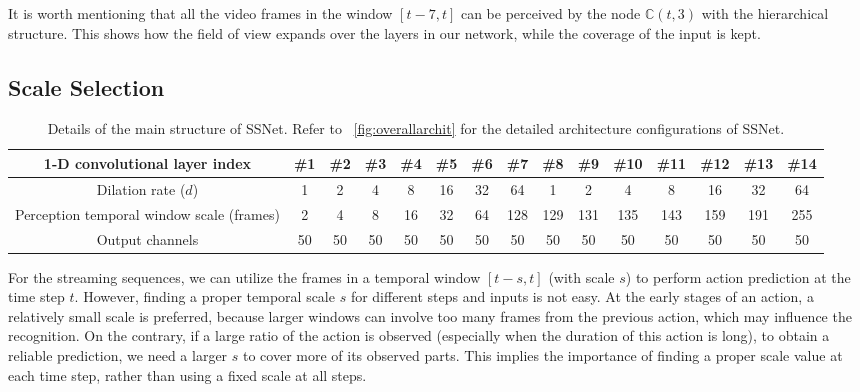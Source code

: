 \documentclass[10pt,twocolumn,letterpaper]{article}
\begin{document}
It is worth mentioning that all the video frames in the window $[t-7,t]$ can be perceived by the node $\mathbb{C}(t,3)$ with the hierarchical structure. This shows how the field of view expands over the layers in our network, while the coverage of the input is kept.







\subsection{Scale Selection}
\label{sec:method:SSS}




\begin{table*}[!tp]
\caption{Details of the main structure of SSNet. Refer to \figurename{~\ref{fig:overallarchit}} for the detailed architecture configurations of SSNet.}
\label{table:ssnetdetails}
\centering
\small
\begin{tabular}{ccccccccccccccc}
\toprule
1-D convolutional layer index                  & \#1 & \#2 & \#3  & \#4& \#5& \#6& \#7 & \#8 & \#9 &\#10 & \#11& \#12& \#13& \#14 \\
\midrule
Dilation rate ($d$)                          &   1 &   2 &   4  & 8  & 16 & 32 & 64  & 1   & 2   &   4 & 8   & 16  & 32  & 64 \\
Perception temporal window scale (frames)      &   2 &   4 &   8  & 16 & 32 & 64 & 128 & 129 & 131 & 135 & 143 & 159 & 191 & 255 \\
Output channels                                &  50 &  50 &  50  & 50 & 50 & 50 &  50 &  50 &  50 &  50 &  50 &  50 &  50 &  50 \\
\bottomrule
\end{tabular}
\end{table*}

For the streaming sequences,
we can utilize the frames in a temporal window $[t-s, t]$ (with scale $s$) to perform action prediction at the time step $t$.
However, finding a proper temporal scale $s$ for different steps and inputs is not easy.
At the early stages of an action,
a relatively small scale is preferred,
because larger windows can involve too many frames from the previous action, which may influence the recognition.
On the contrary, if a large ratio of the action is observed
(especially when the duration of this action is long),
to obtain a reliable prediction,
we need a larger $s$ to cover more of its observed parts.
This implies the importance of finding a proper scale value at each time step, rather than using a fixed scale at all steps.
\end{document}
